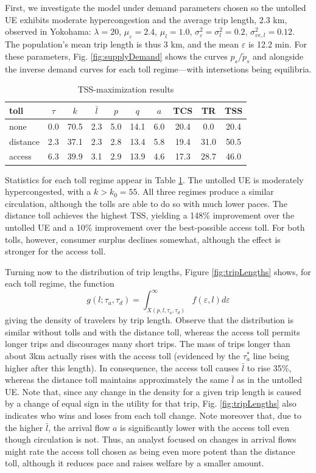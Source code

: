 \documentclass[preprint,authoryear]{elsarticle}
\newcommand{\taud}{\tau_d}
\newcommand{\taua}{\tau_a}
\newcommand{\ve}{\varepsilon}
\begin{document}
First, we investigate the model under demand parameters chosen so the untolled UE exhibits moderate hypercongestion and the average trip length, 2.3 km, observed in Yokohama: $\lambda=20$, $\mu_\ve=2.4$, $\mu_l=1.0$,  $\sigma_\ve^2=\sigma_l^2=0.2$, $\sigma_{ve,l}^2=0.12$. The population's mean trip length is thus 3 km, and the mean $\ve$ is 12.2 min. For these parameters, Fig. \ref{fig:supplyDemand} shows the curves $p_s/\tilde{p}_s$ and alongside the inverse demand curves for each toll regime---with intersetions being equilibria.

\begin{table}
\centering
\begin{tabular}{l||c|c|c|c|c|c|c|c|c}
	toll & $\tau$ & $k$ & $\bar{l}$    & $p$    & $q$     & $a$    & TCS    & TR    & TSS \\ \hline\hline
none   & 0.0 & 70.5 & 2.3 & 5.0 & 14.1 & 6.0 & 20.4 & 0.0  & 20.4 \\ \hline
distance & 2.3 & 37.1 & 2.3 & 2.8 & 13.4 & 5.8 & 19.4 & 31.0 & 50.5 \\ \hline
access   & 6.3 & 39.9 & 3.1 & 2.9 & 13.9 & 4.6 & 17.3 & 28.7 & 46.0 
\end{tabular}
\caption{TSS-maximization results}\label{tab:results}
\end{table}

Statistics for each toll regime appear in Table \ref{tab:results}. The untolled UE is moderately hypercongested, with a $k>k_0=55$. All three regimes produce a similar circulation, although the tolls are able to do so with much lower paces. The distance toll achieves the highest TSS, yielding a 148\% improvement over the untolled UE and a 10\% improvement over the best-possible access toll. For both tolls, however, consumer surplus declines somewhat, although the effect is stronger for the access toll.

Turning now to the distribution of trip lengths, Figure \ref{fig:tripLengths} shows, for each toll regime, the function
\begin{equation}
	g(l;\taua,\taud) = \int_{X(p,l,\taua,\taud)}^{\infty}f(\ve,l)d\ve
\end{equation}
giving the density of travelers by trip length. Observe that the distribution is similar without tolls and with the distance toll, whereas the access toll permits longer trips and discourages many short trips. The mass of trips longer than about 3km actually rises with the access toll (evidenced by the $\taua^*$ line being higher after this length). In consequence, the access toll causes $\bar{l}$ to rise 35\%, whereas the distance toll maintains approximately the same $\bar{l}$ as in the untolled UE. Note that, since any change in the density for a given trip length is caused by a change of equal sign in the utility for that trip, Fig. \ref{fig:tripLengths} also indicates who wins and loses from each toll change. Note moreover that, due to the higher $\bar{l}$, the arrival flow $a$ is significantly lower with the access toll even though circulation is not. Thus, an analyst focused on changes in arrival flows might rate the access toll chosen as being even more potent than the distance toll, although it reduces pace and raises welfare by a smaller amount.
\end{document}
